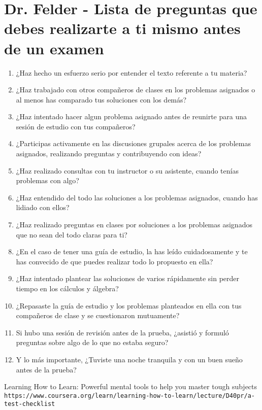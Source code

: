 \documentclass{article}
\begin{document}
	
	\section{Dr. Felder - Lista de preguntas que debes realizarte a ti mismo antes de un examen}
	
	\begin{enumerate}
		\item ¿Haz hecho un esfuerzo serio por entender el texto referente a tu materia?
		
		\item ¿Haz trabajado con otros compa\~neros de clases en los problemas asignados o al menos has comparado tus soluciones con los dem\'as?
		
		\item ¿Haz intentado hacer algun problema asignado antes de reunirte para una sesi\'on de estudio con tus compa\~neros?
		
		\item ¿Participas activamente en las discusiones grupales acerca de los problemas asignados, realizando preguntas y contribuyendo con ideas?
		
		\item ¿Haz realizado consultas con tu instructor o su asistente, cuando ten\'ias problemas con algo?
		
		\item ¿Haz entendido del todo las soluciones a los problemas asignados, cuando has lidiado con ellos?
		
		\item ¿Haz realizado preguntas en clases por soluciones a los problemas asignados que no sean del todo claras para ti?
		
		\item ¿En el caso de tener una gu\'ia de estudio, la has le\'ido cuidadosamente y te has convecido de que puedes realizar todo lo propuesto en ella?
		
		\item ¿Haz intentado plantear las soluciones de varios r\'apidamente sin perder tiempo en los c\'alculos y \'algebra?
		
		\item ¿Repasaste la gu\'ia de estudio y los problemas planteados en ella con tus compa\~neros de clase y se cuestionaron mutuamente?
		
		\item Si hubo una sesi\'on de revisi\'on antes de la prueba, ¿asisti\'o y formul\'o preguntas sobre algo de lo que no estaba seguro?
		
		\item Y lo m\'as importante, ¿Tuviste una noche tranquila y con un buen sue\~no antes de la prueba?
	\end{enumerate}
	
	\begin{thebibliography}{9}
		Learning How to Learn: Powerful mental tools to help you master tough subjects
		\\\texttt{https://www.coursera.org/learn/learning-how-to-learn/lecture/D40pr/a-test-checklist}
	\end{thebibliography}
\end{document}
